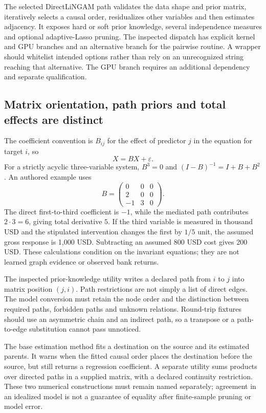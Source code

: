 The selected DirectLiNGAM path validates the data shape and prior matrix,
iteratively selects a causal order, residualizes other variables and then
estimates adjacency. It exposes hard or soft prior knowledge, several
independence measures and optional adaptive-Lasso pruning. The inspected
dispatch has explicit kernel and GPU branches and an alternative branch
for the pairwise routine. A wrapper should whitelist intended options
rather than rely on an unrecognized string reaching that alternative.
The GPU branch requires an additional dependency and separate qualification.
\citep{exec24_lingam_source}

\subsection{Matrix orientation, path priors and total effects are distinct}
The coefficient convention is $B_{ij}$ for the effect of predictor $j$
in the equation for target $i$, so
\[
 X=BX+\varepsilon.
\]
For a strictly acyclic three-variable system, $B^3=0$ and
$(I-B)^{-1}=I+B+B^2$. An authored example uses
\[
 B=\begin{pmatrix}0&0&0\\2&0&0\\-1&3&0\end{pmatrix}.
\]
The direct first-to-third coefficient is $-1$, while the mediated path
contributes $2\cdot3=6$, giving total derivative $5$. If the third variable
is measured in thousand USD and the stipulated intervention changes the
first by $1/5$ unit, the assumed gross response is 1,000 USD. Subtracting
an assumed 800 USD cost gives 200 USD. These calculations condition on
the invariant equations; they are not learned graph evidence or observed
bank returns.~\citep{exec24_lingam_choice}

The inspected prior-knowledge utility writes a declared path from $i$ to
$j$ into matrix position $(j,i)$. Path restrictions are not simply a list
of direct edges. The model conversion must retain the node order and the
distinction between required paths, forbidden paths and unknown relations.
Round-trip fixtures should use an asymmetric chain and an indirect path,
so a transpose or a path-to-edge substitution cannot pass unnoticed.
\citep{exec24_lingam_source,exec24_lingam_choice}

The base estimation method fits a destination on the source and its
estimated parents. It warns when the fitted causal order places the
destination before the source, but still returns a regression coefficient.
A separate utility sums products over directed paths in a supplied matrix,
with a declared continuity restriction. These two numerical constructions
must remain named separately; agreement in an idealized model is not a
guarantee of equality after finite-sample pruning or model error.
\citep{exec24_lingam_source}

